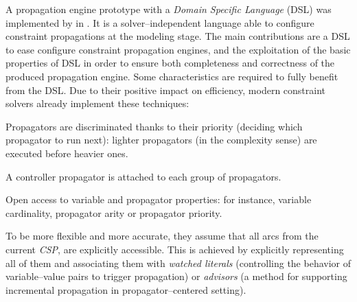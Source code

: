 A propagation engine prototype with a \textit{Domain Specific Language} (DSL) was implemented by  in \cite{Prudhomme2013}. It is a solver--independent language able to configure constraint propagations at the modeling stage. The main contributions are a DSL to ease configure constraint propagation engines, and the exploitation of the basic properties of DSL in order to ensure both completeness and correctness of the produced propagation engine. %
Some characteristics are required to fully benefit from the DSL. Due to their positive impact on efficiency, modern constraint solvers already implement these techniques:
\begin{inparaenum}[i)] %
	\item Propagators are discriminated thanks to their priority (deciding which propagator to run next): lighter propagators (in the complexity sense) are executed before heavier ones.
	\item A controller propagator is attached to each group of propagators.
	\item Open access to variable and propagator properties: for instance, variable cardinality, propagator arity or propagator priority.
\end{inparaenum}%
To be more flexible and more accurate, they assume that all arcs from the current \textit{CSP}, are explicitly accessible. This is achieved by explicitly representing all of them and associating them with {\it watched literals} \cite{Gent2006} (controlling the behavior of variable--value pairs to trigger propagation) or {\it advisors} \cite{Lagerkvist2007} (a method for supporting incremental propagation in propagator--centered setting). %

